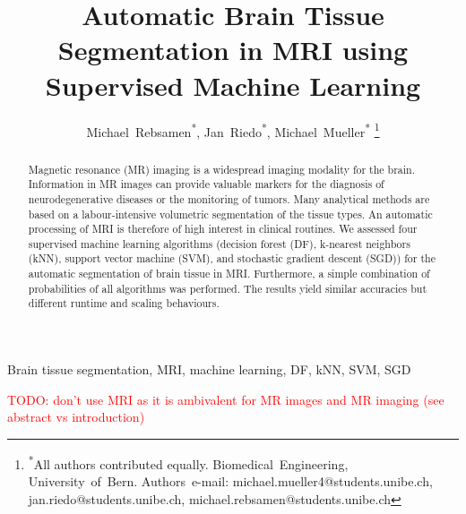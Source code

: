 \documentclass[journal]{IEEEtran}
\newcommand\TODO[1]{\textcolor{red}{TODO: #1}}
\begin{document}
\title{Automatic Brain Tissue Segmentation in MRI using Supervised Machine Learning}

\author{Michael~Rebsamen\textsuperscript{*},
        Jan~Riedo\textsuperscript{*},
        Michael~Mueller\textsuperscript{*}
\thanks{\textsuperscript{*}All authors contributed equally. Biomedical~Engineering, University~of~Bern. Authors~e-mail: michael.mueller4@students.unibe.ch, jan.riedo@students.unibe.ch, michael.rebsamen@students.unibe.ch}}
{}%
\maketitle

\begin{abstract}
Magnetic resonance (MR) imaging is a widespread imaging modality for the brain. Information in MR images can provide valuable markers for the diagnosis of neurodegenerative diseases or the monitoring of tumors. Many analytical methods are based on a labour-intensive volumetric segmentation of the tissue types. An automatic processing of MRI is therefore of high interest in clinical routines. We assessed four supervised machine learning algorithms (decision forest (DF), k-nearest neighbors (kNN), support vector machine (SVM), and stochastic gradient descent (SGD)) for the automatic segmentation of brain tissue in MRI. Furthermore, a simple combination of probabilities of all algorithms was performed. The results yield similar accuracies but different runtime and scaling behaviours.
\end{abstract}



\begin{IEEEkeywords}
Brain tissue segmentation, MRI, machine learning, DF, kNN, SVM, SGD
\end{IEEEkeywords}

\TODO{don't use MRI as it is ambivalent for MR images and MR imaging (see abstract vs introduction)}
\end{document}
